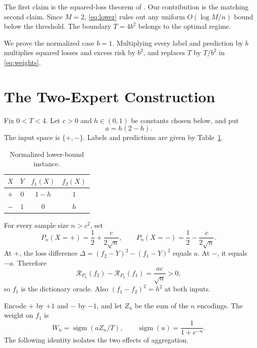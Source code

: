 \documentclass[twoside]{article}
\newcommand{\R}{\mathcal R}
\newcommand{\1}{\mathbf 1}
\newcommand{\sigm}{\operatorname{sigm}}
\begin{document}
The first claim is the squared-loss theorem of \citet{hogsgaard2026aggregation}. Our contribution is the matching second claim. Since $M=2$, \eqref{eq:lower} rules out any uniform $O(\log M/n)$ bound below the threshold. The boundary $T=4b^2$ belongs to the optimal regime.

We prove the normalized case $b=1$. Multiplying every label and prediction by $b$ multiplies squared losses and excess risk by $b^2$, and replaces $T$ by $T/b^2$ in \eqref{eq:weights}.

\section{The Two-Expert Construction}

Fix $0<T<4$. Let $c>0$ and $h\in(0,1)$ be constants chosen below, and put \[ a=h(2-h). \] The input space is $\{+,-\}$. Labels and predictions are given by Table~\ref{tab:construction}.

\begin{table}[h]
\centering
\caption{Normalized lower-bound instance.}
\label{tab:construction}
\begin{tabular}{c@{\qquad}ccc}
\toprule
$X$ & $Y$ & $f_1(X)$ & $f_2(X)$\\
\midrule
$+$ & $0$ & $1-h$ & $1$\\
$-$ & $1$ & $0$ & $h$\\
\bottomrule
\end{tabular}
\end{table}

For every sample size $n>c^2$, set
\begin{equation}
P_n(X=+)=\frac12+\frac{c}{2\sqrt n},
\qquad P_n(X=-)=\frac12-\frac{c}{2\sqrt n}.
\label{eq:pn}
\end{equation}
At $+$, the loss difference $\Delta=(f_2-Y)^2-(f_1-Y)^2$ equals $a$. At $-$, it equals $-a$. Therefore
\begin{equation}
\R_{P_n}(f_2)-\R_{P_n}(f_1)=\frac{ac}{\sqrt n}>0,
\label{eq:riskgap}
\end{equation}
so $f_1$ is the dictionary oracle. Also $(f_1-f_2)^2=h^2$ at both inputs.

Encode $+$ by $+1$ and $-$ by $-1$, and let $Z_n$ be the sum of the $n$ encodings. The weight on $f_1$ is
\begin{equation}
W_n=\sigm(aZ_n/T),
\qquad \sigm(u)=\frac{1}{1+e^{-u}}.
\label{eq:logistic}
\end{equation}
The following identity isolates the two effects of aggregation.
\end{document}
